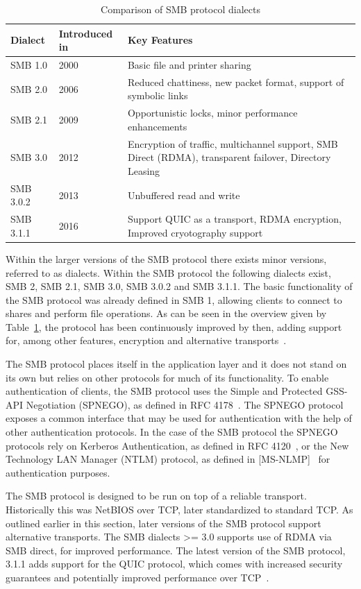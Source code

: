 \documentclass[english, 12pt, a4paper, elec, utf8, a-2b, online]{aaltothesis}
\begin{document}
\begin{table}[h]
\centering
\caption{Comparison of SMB protocol dialects}
\label{tab:smb_dialects}
\begin{tabular}{|l|p{5cm}|p{5cm}|}
\hline
\textbf{Dialect} & \textbf{Introduced in} & \textbf{Key Features}\\ \hline
SMB 1.0 & 2000 & Basic file and printer sharing \\ \hline
SMB 2.0 & 2006 & Reduced chattiness, new packet format, support of symbolic links \\ \hline
SMB 2.1 & 2009 & Opportunistic locks, minor performance enhancements \\ \hline
SMB 3.0 & 2012 & Encryption of traffic, multichannel support, SMB Direct (RDMA), transparent failover, Directory Leasing \\ \hline
SMB 3.0.2 & 2013 & Unbuffered read and write \\ \hline
SMB 3.1.1 & 2016 & Support QUIC as a transport, RDMA encryption, Improved cryotography support \\ \hline
\end{tabular}
\end{table}

Within the larger versions of the SMB protocol there exists minor versions, referred
to as dialects. Within the SMB protocol the following dialects exist, SMB 2,
SMB 2.1, SMB 3.0, SMB 3.0.2 and SMB 3.1.1. The basic functionality of the SMB protocol
was already defined in SMB 1, allowing clients to connect to shares and perform file
operations. As can be seen in the overview given by Table~\ref{tab:smb_dialects},
the protocol has been continuously improved by then, adding support for, among other
features, encryption and alternative transports~\cite{smb2_tech}.

The SMB protocol places itself in the application layer and it does not stand on its
own but relies on other protocols for much of its functionality. To enable authentication
of clients, the SMB protocol uses the Simple and Protected GSS-API Negotiation (SPNEGO), as
defined in RFC 4178~\cite{rfc4178}. The SPNEGO protocol exposes a common interface
that may be used for authentication with the help of other authentication protocols.
In the case of the SMB protocol the SPNEGO protocols rely on Kerberos Authentication, as
defined in RFC 4120~\cite{rfc4120}, or the New Technology LAN Manager (NTLM) protocol,
as defined in {[MS-NLMP]}~\cite{ntlm_tech} for authentication purposes.

The SMB protocol is designed to be run on top of a reliable transport. Historically
this was NetBIOS over TCP, later standardized to standard TCP. As outlined earlier
in this section, later versions of the SMB protocol support alternative transports. The
SMB dialects >= 3.0 supports use of RDMA via SMB direct, for improved performance.
The latest version of the SMB protocol, 3.1.1 adds support for the QUIC protocol,
which comes with increased security guarantees and potentially improved performance
over TCP~\cite{smb2_tech}.
\end{document}
